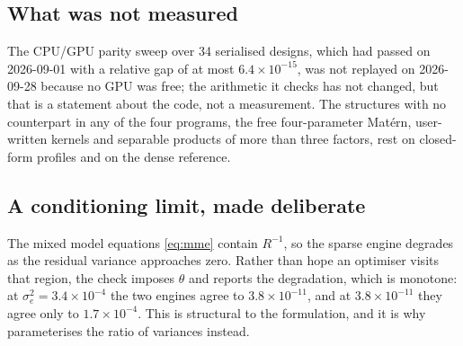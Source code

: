 \subsection{What was not measured}

The CPU/GPU parity sweep over 34 serialised designs, which had passed on
2026-09-01 with a relative gap of at most $6.4 \times 10^{-15}$, was not
replayed on 2026-09-28 because no GPU was free; the arithmetic it checks has
not changed, but that is a statement about the code, not a measurement. The
structures with no counterpart in any of the four programs, the free
four-parameter Mat\'ern, user-written kernels and separable products of more
than three factors, rest on closed-form profiles and on the dense reference.

\subsection{A conditioning limit, made deliberate}

The mixed model equations \eqref{eq:mme} contain $R^{-1}$, so the sparse
engine degrades as the residual variance approaches zero. Rather than hope an
optimiser visits that region, the check imposes $\theta$ and reports the
degradation, which is monotone: at $\sigma_e^2 = 3.4 \times 10^{-4}$ the two
engines agree to $3.8 \times 10^{-11}$, and at $3.8 \times 10^{-11}$ they
agree only to $1.7 \times 10^{-4}$. This is structural to the formulation,
and it is why  parameterises the ratio of variances instead.
